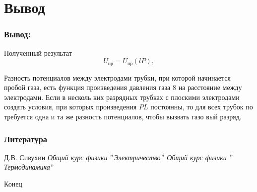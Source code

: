 \documentclass{beamer}
\begin{document}
\section{Вывод}
\begin{frame}

\frametitle{Вывод:}
\vspace{-10pt}
\begin{block}{Полученный результат}
\begin{equation*}
    U_{\text{пр}} = U_{\text{пр}}(lP),
\end{equation*}
\end{block}
\par
Разность потенциалов между электродами трубки,
при которой начинается пробой газа, есть функция произведения
давления газа 8 на расстояние между электродами. Если в несколь
ких разрядных трубках с плоскими электродами создать условия,
при которых произведения $PL$ постоянны, то для всех трубок по
требуется одна и та же разность потенциалов, чтобы вызвать газо
вый разряд.

\end{frame}


\begin{frame}
\frametitle{Литература}
\footnotesize{
\begin{thebibliography}{99} %
 Д.В. Сивухин
\newblock
\newblock \emph{Общий курс физики $"$Электричество$"$}
\newblock \emph{Общий курс физики $"$Термодинамика$"$}

\end{thebibliography}
}
\end{frame}


\begin{frame}
\Huge{\centerline{Конец}}
\end{frame}

\end{document}
